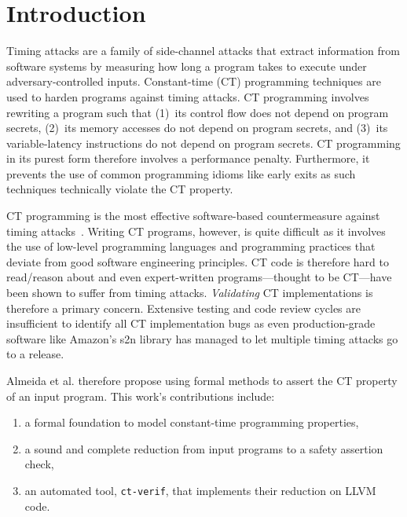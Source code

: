 \section{Introduction}

Timing attacks are a family of side-channel attacks that extract information from software systems by measuring how long a program takes to execute under adversary-controlled inputs.
Constant-time (CT) programming techniques are used to harden programs against timing attacks.
CT programming involves rewriting a program such that (1)~its control flow does not depend on program secrets, (2)~its memory accesses do not depend on program secrets, and (3)~its variable-latency instructions do not depend on program secrets.
CT programming in its purest form therefore involves a performance penalty.
Furthermore, it prevents the use of common programming idioms like early exits as such techniques technically violate the CT property.

CT programming is the most effective software-based countermeasure against timing attacks~\cite{bernstein_cache_timing_attacks, dsa_exponentiations}.
Writing CT programs, however, is quite difficult as it involves the use of low-level programming languages and programming practices that deviate from good software engineering principles.
CT code is therefore hard to read/reason about and even expert-written programs---thought to be CT---have been shown to suffer from timing attacks.
\emph{Validating} CT implementations is therefore a primary concern.
Extensive testing and code review cycles are insufficient to identify all CT implementation bugs as even production-grade software like Amazon's s2n library has managed to let multiple timing attacks go to a release.

Almeida et al. therefore propose using formal methods to assert the CT property of an input program.
This work's contributions include:
\begin{enumerate}[label=(\roman*)]
  \item a formal foundation to model constant-time programming properties,
  \item a sound and complete reduction from input programs to a safety assertion check,
  \item an automated tool, \texttt{ct-verif}, that implements their reduction on LLVM code.
\end{enumerate}
